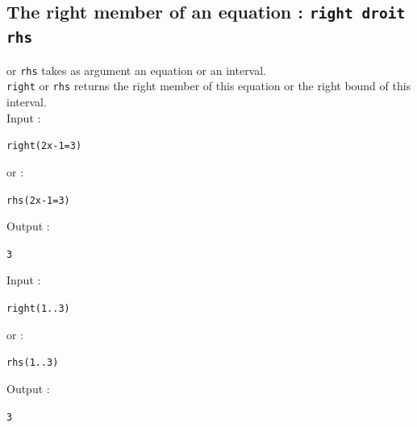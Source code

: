 \documentclass[a4paper,11pt]{book}
\begin{document}
\subsection{The right member of an equation : {\tt right  droit rhs}} 
 or {\tt rhs} takes as argument an equation or an 
interval.\\
{\tt right}  or  {\tt rhs} returns the right member of this equation or the 
right bound of this interval.\\
Input :
\begin{center}{\tt right(2x-1=3)}\end{center}
or :
\begin{center}{\tt rhs(2x-1=3)}\end{center}
Output :
\begin{center}{\tt 3}\end{center}
Input :
\begin{center}{\tt right(1..3)}\end{center}
or :
\begin{center}{\tt rhs(1..3)}\end{center}
Output :
\begin{center}{\tt 3}\end{center}
\end{document}
